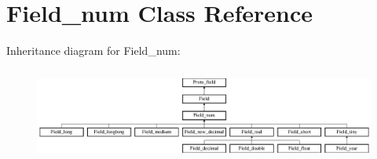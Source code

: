 \hypertarget{classField__num}{}\section{Field\+\_\+num Class Reference}
\label{classField__num}
Inheritance diagram for Field\+\_\+num\+:\begin{figure}[H]
\begin{center}
\leavevmode
\includegraphics[height=3.125000cm]{classField__num}
\end{center}
\end{figure}
